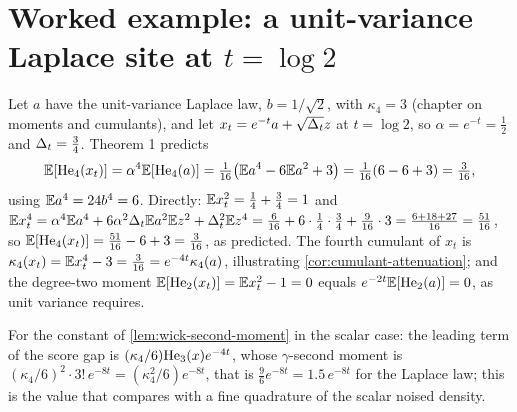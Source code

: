 \section{Worked example: a unit-variance Laplace site at $t=\log2$}

Let $a$ have the unit-variance Laplace law, $b=1/\sqrt2$, with $\kappa_4=3$ (chapter on
moments and cumulants), and let $x_t=e^{-t}a+\sqrt{\Delta_t}z$ at $t=\log2$, so
$\alpha=e^{-t}=\tfrac12$ and $\Delta_t=\tfrac34$. Theorem 1 predicts
\[
  \mathbb{E}[\mathrm{He}_{4}(x_t)]=\alpha^4\mathbb{E}[\mathrm{He}_{4}(a)]=\tfrac1{16}\bigl(\mathbb{E} a^4-6\mathbb{E} a^2+3\bigr)=\tfrac1{16}(6-6+3)=\tfrac3{16},
\]
using $\mathbb{E} a^4=24b^4=6$. Directly: $\mathbb{E} x_t^2=\tfrac14+\tfrac34=1$ and
$\mathbb{E} x_t^4=\alpha^4\mathbb{E} a^4+6\alpha^2\Delta_t\mathbb{E} a^2\mathbb{E} z^2+\Delta_t^2\mathbb{E} z^4=\tfrac6{16}+6\cdot\tfrac14\cdot\tfrac34+\tfrac9{16}\cdot3=\tfrac{6+18+27}{16}=\tfrac{51}{16}$,
so $\mathbb{E}[\mathrm{He}_{4}(x_t)]=\tfrac{51}{16}-6+3=\tfrac3{16}$, as predicted. The fourth cumulant of
$x_t$ is $\kappa_4(x_t)=\mathbb{E} x_t^4-3=\tfrac3{16}=e^{-4t}\kappa_4(a)$, illustrating
\cref{cor:cumulant-attenuation}; and the degree-two moment $\mathbb{E}[\mathrm{He}_{2}(x_t)]=\mathbb{E} x_t^2-1=0$
equals $e^{-2t}\mathbb{E}[\mathrm{He}_{2}(a)]=0$, as unit variance requires.

For the constant of \cref{lem:wick-second-moment} in the scalar case: the leading term
of the score gap is $(\kappa_4/6)\mathrm{He}_{3}(x)e^{-4t}$, whose $\gamma$-second moment is
$(\kappa_4/6)^2\cdot3!\,e^{-8t}=(\kappa_4^2/6)e^{-8t}$, that is $\tfrac96e^{-8t}=1.5\,e^{-8t}$
for the Laplace law; this is the value that 
compares with a fine quadrature of the scalar noised density.


